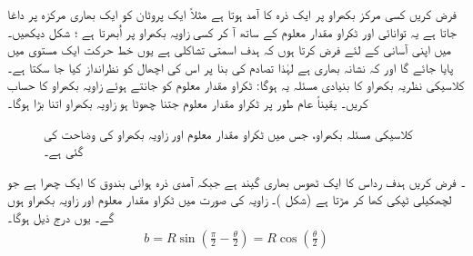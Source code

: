 فرض کریں کسی مرکز بکھراو پر ایک ذرہ کا آمد ہوتا ہے مثلاً ایک پروٹان کو ایک بھاری مرکزہ پر داغا جاتا ہے یہ توانائی   اور ٹکراو مقدار معلوم  کے ساتھ آ کر کسی زاویہ  بکھراو  پر اُبھرتا ہے  ؛ شکل   دیکھیں۔ میں اپنی آسانی کے لئے فرض کرتا ہوں کہ ہدف اسمتی تشاکلی ہے یوں خط حرکت ایک مستوی میں پایا جائے گا اور کہ نشانہ بھاری ہے لہٰذا  تصادم  کی بنا پر اس کی اچھال  کو نظرانداز کیا جا سکتا ہے۔ کلاسیکی نظریہ بکھراو کا بنیادی مسئلہ یہ ہوگا: ٹکراو مقدار معلوم کو جانتے ہوئے زاویہ بکھراو کا حساب کریں۔ یقیناً عام طور پر ٹکراو مقدار معلوم جتنا چھوٹا ہو زاویہ بکھراو اتنا بڑا ہوگا۔
\begin{figure}
\centering
{}
\caption{کلاسیکی مسئلہ بکھراو، جس میں ٹکراو مقدار معلوم  اور زاویہ بکھراو  کی وضاحت کی گئی ہے۔}
\label{شکل_بکھراو_کلاسیکی_ٹکراو_اور_زاویہ}
\end{figure}


۔ فرض کریں ہدف رداس  کا ایک ٹھوس بھاری گیند ہے جبکہ آمدی ذرہ ہوائی بندوق کا ایک چھرا  ہے جو لچھکیلی ٹپکی کھا کر مڑتا ہے  (شکل )۔ زاویہ  کی صورت میں ٹکراو مقدار معلوم  اور زاویہ بکھراو  ہوں گے۔ یوں درج ذیل ہوگا۔
\begin{align}
	b = R\sin\left(\frac{\pi}{2}-\frac{\theta}{2}\right) = R\cos\left(\frac{\theta}{2}\right)
\end{align}

